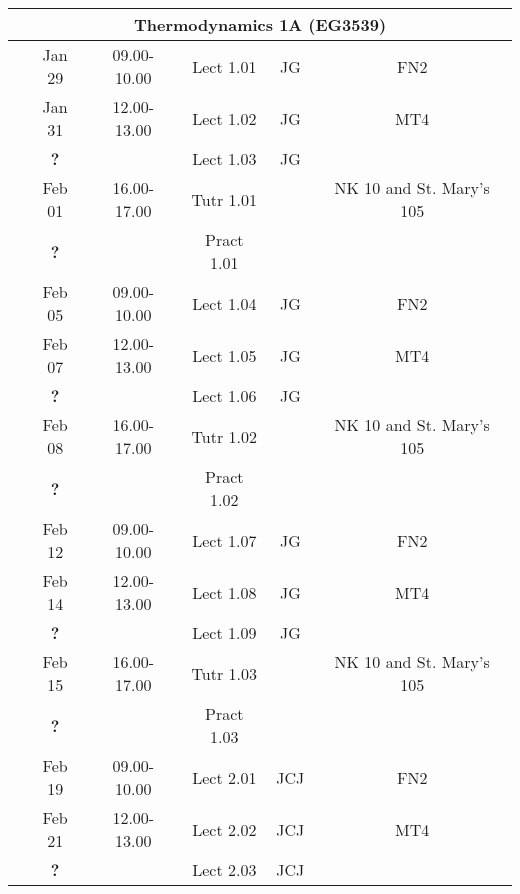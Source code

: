 \documentclass[11pt,oneside,a4paper]{article}
\begin{document}
\begin{center}
\begin{tabular}{||c||c|c|c|c|c||}
\hline\hline
\multicolumn{6}{||c||}{Thermodynamics 1A (EG3539)} \\
\hline\hline
\multirow{6}{*}{\color{red}{Week 30}} & Jan 29   & 09.00-10.00 & Lect  1.01  & JG  & FN2 \\
                                      & Jan 31   & 12.00-13.00 & Lect  1.02  & JG  & MT4 \\
                                      &  {\bf ?} &             & Lect  1.03  & JG  &     \\
                                      & Feb 01   & 16.00-17.00 & Tutr  1.01  &     & NK 10 and St. Mary's 105 \\
                                      &  {\bf ?} &             & Pract 1.01  &     &     \\
\hline
\multirow{6}{*}{\color{red}{Week 31}} & Feb 05   & 09.00-10.00 & Lect  1.04  & JG  & FN2 \\
                                      & Feb 07   & 12.00-13.00 & Lect  1.05  & JG  & MT4 \\
                                      &  {\bf ?} &             & Lect  1.06  & JG  &     \\
                                      & Feb 08   & 16.00-17.00 & Tutr  1.02  &     & NK 10 and St. Mary's 105 \\
                                      &  {\bf ?} &             & Pract 1.02  &     &     \\
\hline
\multirow{6}{*}{\color{red}{Week 32}} & Feb 12   & 09.00-10.00 & Lect  1.07  & JG  & FN2 \\
                                      & Feb 14   & 12.00-13.00 & Lect  1.08  & JG  & MT4 \\
                                      &  {\bf ?} &             & Lect  1.09  & JG  &     \\
                                      & Feb 15   & 16.00-17.00 & Tutr  1.03  &     & NK 10 and St. Mary's 105 \\
                                      &  {\bf ?} &             & Pract 1.03  &     &     \\
\hline
\multirow{6}{*}{\color{red}{Week 33}} & Feb 19   & 09.00-10.00 & Lect  2.01  & JCJ & FN2 \\
                                      & Feb 21   & 12.00-13.00 & Lect  2.02  & JCJ & MT4 \\
                                      &  {\bf ?} &             & Lect  2.03  & JCJ &     \\

\end{tabular}
\end{center}
\end{document}

